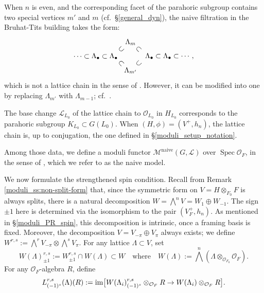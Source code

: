 \documentclass[pdflatex,sn-mathphys-num]{sn-jnl}%
\makeatletter
\theoremstyle{thmstyleone}%
\theoremstyle{thmstyletwo}%
\numberwithin{equation}{subsection}
\theoremstyle{thmstylethree}%
\newcommand{\CL}{\ensuremath{\mathcal{L}}\xspace}
\newcommand{\CM}{\ensuremath{\mathcal{M}}\xspace}
\newcommand{\CO}{\ensuremath{\mathcal{O}}\xspace}
\DeclareMathOperator{\im}{im}
\newcommand{\naive}{\ensuremath{\mathrm{naive}}\xspace}
\DeclareMathOperator{\Spec}{Spec}
\renewcommand{\to}{%
		\ifbool{@display}{\longrightarrow}{\rightarrow}%
	}
\makeatother
\begin{document}
When $n$ is even, and the corresponding facet of the parahoric subgroup contains two special vertices $m'$ and $m$ (cf.\ \S \ref{general_dyn}), the naive filtration in the Bruhat-Tits building takes the form:
\begin{equation*}
\xy
(-17,7)*+{\cdots\subset\Lambda_\bullet\subset \Lambda_\bullet};
(-4.5,3.5)*+{\rotatebox{-45}{$\,\, \subset\,\,$}};
(-4.5,10.5)*+{\rotatebox{45}{$\,\, \subset\,\,$}};
(0,14)*+{\Lambda_m};
(0,0)*+{\Lambda_{m'}};
(4,3.5)*+{\rotatebox{45}{$\,\, \subset\,\,$}};
(4,10.5)*+{\rotatebox{-45}{$\,\, \subset\,\,$}};
(19,7)*+{\Lambda_\bullet \subset  \Lambda_\bullet\subset\cdots,}.
\endxy
\end{equation*}
which is not a lattice chain in the sense of \cite[Definition 3.14]{RZ}. However, it can be modified into one by replacing $\Lambda_{m'}$ with $\Lambda_{m-1}$; cf.\ \cite[4.b]{PR2008}.

The base change $\CL_{L_0}$ of the lattice chain to $\CO_{L_0}$ in $H_{L_0}$ corresponds to the parahoric subgroup $K_{L_0}\subset G(L_0)$.
When $(H,\phi)=(V^+,h_n)$, the lattice chain is, up to conjugation, the one defined in \S \ref{moduli_setup_notation}.

Among those data, we define a moduli functor $\CM^\naive(G,\CL)$ over $\Spec \CO_F$, in the sense of \cite[Definition 3.27]{RZ}, which we refer to as the naive model.
		
We now formulate the strengthened spin condition. 
Recall from Remark \ref{moduli_ss:non-split-form} that, since the symmetric form on $V=H\otimes_{F_0}F$ is always splits, there is a natural decomposition $W=\bigwedge^n V=W_1\oplus W_{-1}$.
The sign $\pm 1$ here is determined via the isomorphism to the pair $(V^+_{F},h_n)$. As mentioned in \S \ref{moduli_PR_spin}, this decomposition is intrinsic, once a framing basis is fixed.	
Moreover, the decomposition $V=V_{-\pi}\oplus V_\pi$ always exists; we define $W^{r,s}:=\bigwedge^rV_{-\pi}\otimes\bigwedge^sV_{\pi}$.	
For any lattice $\Lambda\subset V$, set 
$$W(\Lambda)_{\pm 1}^{r,s} := W_{\pm 1}^{r,s} \cap W(\Lambda) \subset W\quad\text{where}\quad W(\Lambda):=\bigwedge^n(\Lambda\otimes_{\CO_{F_0}}\CO_F).$$ 
For any $\CO_F$-algebra $R$, define
\begin{equation*}
    L^{r,s}_{(-1)^s}(\Lambda)(R):=\im\bigl[ W(\Lambda_i)_{(-1)^s}^{r,s} \otimes_{\CO_F} R \to W(\Lambda_i) \otimes_{\CO_{F}}R\bigr].
\end{equation*}
\end{document}
